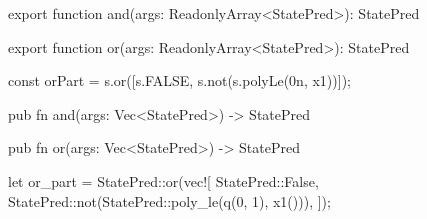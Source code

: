 \begin{tssrc}
export function and(args: ReadonlyArray<StatePred>): StatePred

export function or(args: ReadonlyArray<StatePred>): StatePred
\end{tssrc}
\begin{tssrc}
const orPart = s.or([s.FALSE, s.not(s.polyLe(0n, x1))]);
\end{tssrc}
\begin{rustsrc}
pub fn and(args: Vec<StatePred>) -> StatePred

pub fn or(args: Vec<StatePred>) -> StatePred
\end{rustsrc}
\begin{rustsrc}
let or_part = StatePred::or(vec![
    StatePred::False,
    StatePred::not(StatePred::poly_le(q(0, 1), x1())),
]);
\end{rustsrc}
